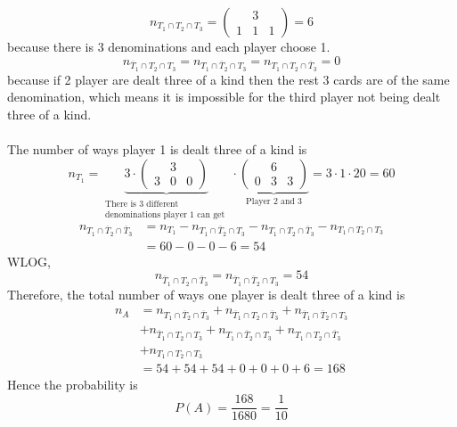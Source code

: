 \documentclass[11pt]{article}
\begin{document}
\[
n_{T_1 \cap T_2 \cap T_3} = 
\begin{pmatrix}
& 3 \\
1 & 1 & 1
\end{pmatrix}
= 6
\]
because there is 3 denominations and each player choose 1.
\[
n_{\overline{T}_1 \cap T_2 \cap T_3} = n_{T_1 \cap \overline{T}_2 \cap T_3} = n_{T_1 \cap T_2 \cap \overline{T}_3} = 0 
\]
because if 2 player are dealt three of a kind then the rest 3 cards are of the same denomination, which means it is impossible for the third player not being dealt three of a kind. \\~\\
The number of ways player 1 is dealt three of a kind is 
\[
n_{T_1} = 
\underbrace{
3 \cdot
\begin{pmatrix}
& 3 \\
3 & 0 & 0
\end{pmatrix}
}_{
\substack{
\text{There is 3 different} \\
\text{denominations player 1 can get }
}}
\cdot 
\underbrace{
\begin{pmatrix}
& 6 \\
0 & 3 & 3
\end{pmatrix}
}_{\text{Player 2 and 3}}
= 3 \cdot 1 \cdot 20 = 60
\]
\begin{equation*}
\begin{aligned}
n_{T_1 \cap \overline{T}_2 \cap \overline{T}_3} 
&= n_{T_1}-n_{T_1 \cap \overline{T}_2 \cap T_3} - n_{T_1 \cap T_2 \cap \overline{T}_3} - n_{T_1 \cap T_2 \cap T_3}\\
&= 60 - 0 - 0 - 6 = 54
\end{aligned}
\end{equation*}
WLOG,
\[n_{\overline{T}_1 \cap T_2 \cap \overline{T}_3} = n_{\overline{T}_1 \cap \overline{T}_2 \cap T_3} = 54\]
Therefore, the total number of ways one player is dealt three of a kind is
\begin{equation*}
\begin{aligned}
n_A &= n_{T_1 \cap \overline{T}_2 \cap \overline{T}_3}  + n_{\overline{T}_1 \cap T_2 \cap \overline{T}_3} + n_{\overline{T}_1 \cap \overline{T}_2 \cap T_3} \\ 
&+n_{\overline{T}_1 \cap T_2 \cap T_3} + n_{T_1 \cap \overline{T}_2 \cap T_3} + n_{T_1 \cap T_2 \cap \overline{T}_3} \\
&+ n_{T_1 \cap T_2 \cap T_3} \\
&= 54+54+54+0+0+0+6 = 168
\end{aligned}
\end{equation*} 
Hence the probability is
\[
P(A) = \frac{168}{1680} = \frac{1}{10}
\]
\pagebreak
\end{document}
